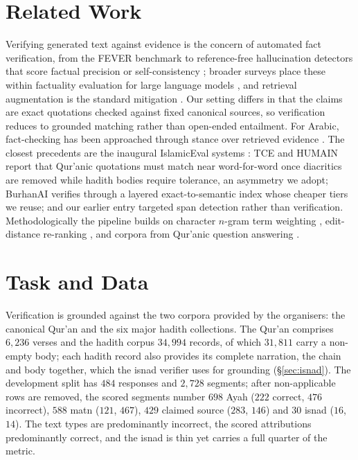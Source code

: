 \documentclass[11pt]{article}
\begin{document}
\section{Related Work}
\label{sec:related}
Verifying generated text against evidence is the concern of automated fact verification, from the
FEVER benchmark \citep{thorne2018fever} to reference-free hallucination detectors that score factual
precision or self-consistency \citep{manakul2023selfcheckgpt,min2023factscore}; broader surveys place
these within factuality evaluation for large language models \citep{ji2023survey}, and retrieval
augmentation is the standard mitigation \citep{lewis2020rag}. Our setting differs in that the claims
are exact quotations checked against fixed canonical sources, so verification reduces to grounded
matching rather than open-ended entailment. For Arabic, fact-checking has been approached through
stance over retrieved evidence \citep{alhindi2021arastance}. The closest precedents are the inaugural
IslamicEval systems \citep{mubarak2025islamiceval}: TCE \citep{tce2025} and HUMAIN \citep{humain2025}
report that Qur'anic quotations must match near word-for-word once diacritics are removed while hadith
bodies require tolerance, an asymmetry we adopt; BurhanAI \citep{burhanai2025} verifies through a
layered exact-to-semantic index whose cheaper tiers we reuse; and our earlier entry
\citep{eldin2025isnad} targeted span detection rather than verification. Methodologically the pipeline
builds on character $n$-gram term weighting \citep{salton1988tfidf,pedregosa2011scikit}, edit-distance
re-ranking \citep{levenshtein1966,rapidfuzz}, and corpora from Qur'anic question answering
\citep{malhas2020quranqa}.

\section{Task and Data}
\label{sec:task}
Verification is grounded against the two corpora provided by the organisers: the canonical Qur'an and
the six major hadith collections. The Qur'an comprises $6{,}236$ verses and the hadith corpus
$34{,}994$ records, of which $31{,}811$ carry a non-empty body; each hadith record also provides its
complete narration, the chain and body together, which the isnad verifier uses for grounding
(\S\ref{sec:isnad}). The development split has $484$ responses and $2{,}728$
segments; after non-applicable rows are removed, the scored segments number $698$ Ayah ($222$ correct,
$476$ incorrect), $588$ matn ($121$, $467$), $429$ claimed source ($283$, $146$) and $30$ isnad ($16$,
$14$). The text types are predominantly incorrect, the scored attributions predominantly correct, and
the isnad is thin yet carries a full quarter of the metric.
\end{document}
